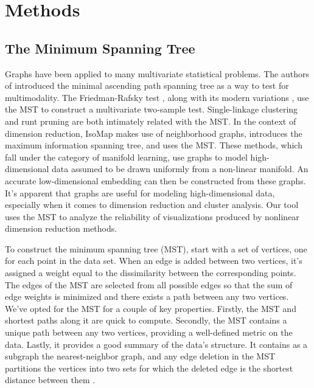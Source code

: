 \documentclass{article}
\begin{document}
\section{Methods}

\subsection{The Minimum Spanning Tree}
Graphs have been applied to many multivariate statistical problems. The authors of \cite{MAP test} introduced the minimal ascending path spanning tree as a way to test for multimodality. The Friedman-Rafsky test \cite{Friedman-Rafsky test}, along with its modern variations \cite{Friedman-Rafsky variation 1, Friedman-Rafsky variation 2, Friedman-Rafsky variation 3}, use the MST to construct a multivariate two-sample test. Single-linkage clustering \cite{single-linkage and MST} and runt pruning \cite{runt pruning} are both intimately related with the MST. In the context of dimension reduction, IsoMap \cite{IsoMap} makes use of neighborhood graphs, \cite{MIST example} introduces the maximum information spanning tree, and \cite{MST example} uses the MST. These methods, which fall under the category of manifold learning, use graphs to model high-dimensional data assumed to be drawn uniformly from a non-linear manifold. An accurate low-dimensional embedding can then be constructed from these graphs. It's apparent that graphs are useful for modeling high-dimensional data, especially when it comes to dimension reduction and cluster analysis. Our tool uses the MST to analyze the reliability of visualizations produced by nonlinear dimension reduction methods.

To construct the minimum spanning tree (MST), start with a set of vertices, one for each point in the data set. When an edge is added between two vertices, it's assigned a weight equal to the dissimilarity between the corresponding points. The edges of the MST are selected from all possible edges so that the sum of edge weights is minimized and there exists a path between any two vertices. We've opted for the MST for a couple of key properties. Firstly, the MST and shortest paths along it are quick to compute. Secondly, the MST contains a unique path between any two vertices, providing a well-defined metric on the data. Lastly, it provides a good summary of the data's structure. It contains as a subgraph the nearest-neighbor graph, and any edge deletion in the MST partitions the vertices into two sets for which the deleted edge is the shortest distance between them \cite{Friedman-Rafsky test}.
\end{document}
